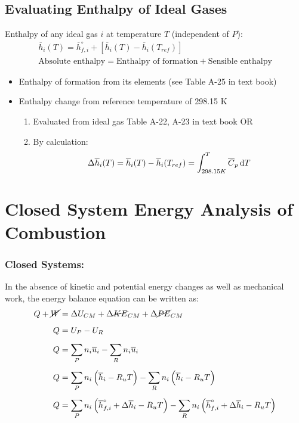 \subsection{Evaluating Enthalpy of Ideal Gases}
Enthalpy of any ideal gas $i$ at temperature $T$ (independent of $P$):
\begin{gather}
  \overline{h}_{i}(T) = \overline{h}_{f,i}^\circ + \left[\overline{h}_{i}(T) - \overline{h}_{i}(T_{ref})\right] \\[5pt]
  \text{Absolute enthalpy}  = \text{Enthalpy of formation} + \text{Sensible enthalpy}
\end{gather}
\begin{itemize}[noitemsep]
  \item Enthalpy of formation from its elements (see Table A-25 in text book)
  \item Enthalpy change from reference temperature of 298.15 K
        \begin{enumerate}[noitemsep]
          \item Evaluated from ideal gas Table A-22, A-23 in text book OR
          \item By calculation:
                \begin{gather}
                  \Delta \overline{h}_i(T) = \overline{h}_i(T) - \overline{h}_i(T_{ref}) = \int_{298.15K}^{T}\overline{C}_{p}\dif T
                \end{gather}
        \end{enumerate}
\end{itemize}
\section{Closed System Energy Analysis of Combustion}
\subsubsection{Closed Systems:}
In the absence of kinetic and potential energy changes as well as mechanical work, the energy balance equation can be written as:
\begin{align}
  Q + \cancel{W} & = \Delta U_{CM} + \Delta\cancel{KE}_{CM} + \Delta\cancel{PE}_{CM}                                                                                                     \\[5pt]
  Q              & = U_P - U_R                                                                                                                                                           \\[5pt]
  Q              & = \sum_{P}n_i\overline{u}_i - \sum_{R}n_i\overline{u}_i                                                                                                               \\[5pt]
  Q              & = \sum_{P}n_i\left(\overline{h}_i - R_uT\right) - \sum_{R}n_i\left(\overline{h}_i - R_uT\right)                                                                       \\[5pt]
  Q              & = \sum_{P}n_i\left(\overline{h}_{f,i}^\circ + \Delta\overline{h}_{i} - R_uT\right) - \sum_{R}n_i\left(\overline{h}_{f,i}^\circ + \Delta\overline{h}_{i} - R_uT\right)
\end{align}
